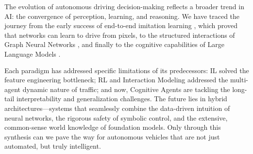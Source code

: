 \documentclass[12pt, a4paper]{article}
\begin{document}
The evolution of autonomous driving decision-making reflects a broader trend in AI: the convergence of perception, learning, and reasoning. We have traced the journey from the early success of end-to-end imitation learning \citep{bojarski2016end}, which proved that networks can learn to drive from pixels, to the structured interactions of Graph Neural Networks \citep{gao2020vectornet}, and finally to the cognitive capabilities of Large Language Models \citep{wen2023dilu}.

Each paradigm has addressed specific limitations of its predecessors: IL solved the feature engineering bottleneck; RL and Interaction Modeling addressed the multi-agent dynamic nature of traffic; and now, Cognitive Agents are tackling the long-tail interpretability and generalization challenges. The future lies in hybrid architectures—systems that seamlessly combine the data-driven intuition of neural networks, the rigorous safety of symbolic control, and the extensive, common-sense world knowledge of foundation models. Only through this synthesis can we pave the way for autonomous vehicles that are not just automated, but truly intelligent.



\end{document}
